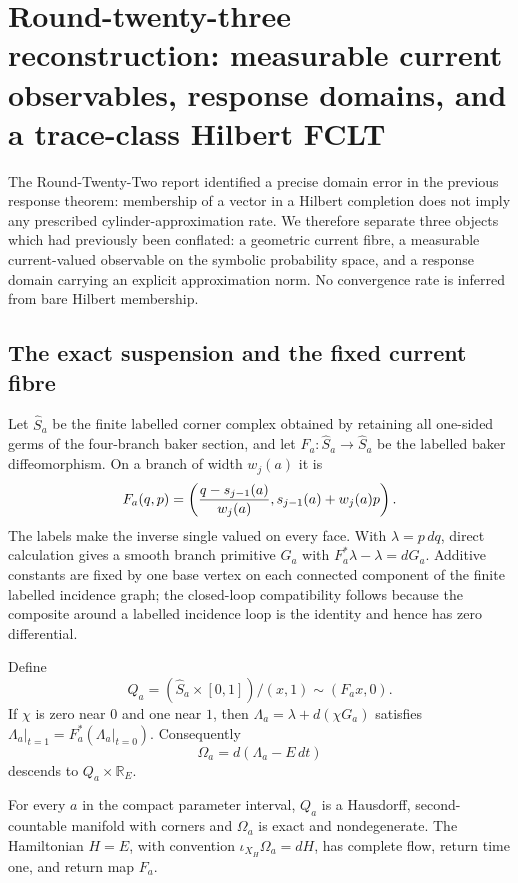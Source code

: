 \section{Round-twenty-three reconstruction: measurable current observables, response domains, and a trace-class Hilbert FCLT}
\label{sec:r23-a1}

The Round-Twenty-Two report identified a precise domain error in the previous
response theorem: membership of a vector in a Hilbert completion does not imply
any prescribed cylinder-approximation rate.  We therefore separate three
objects which had previously been conflated: a geometric current fibre, a
measurable current-valued observable on the symbolic probability space, and a
response domain carrying an explicit approximation norm.  No convergence rate
is inferred from bare Hilbert membership.

\subsection{The exact suspension and the fixed current fibre}

Let $\widehat S_a$ be the finite labelled corner complex obtained by retaining
all one-sided germs of the four-branch baker section, and let
$F_a:\widehat S_a\to\widehat S_a$ be the labelled baker diffeomorphism.  On a
branch of width $w_j(a)$ it is
\[
 F_a(q,p)=\left({q-s_{j-1}(a)\over w_j(a)},
 s_{j-1}(a)+w_j(a)p\right).
\]
The labels make the inverse single valued on every face.  With
$\lambda=p\,dq$, direct calculation gives a smooth branch primitive $G_a$ with
$F_a^*\lambda-\lambda=dG_a$.  Additive constants are fixed by one base vertex
on each connected component of the finite labelled incidence graph; the
closed-loop compatibility follows because the composite around a labelled
incidence loop is the identity and hence has zero differential.

Define
\[
 Q_a=(\widehat S_a\times[0,1])/(x,1)\sim(F_ax,0).
\]
If $\chi$ is zero near $0$ and one near $1$, then
$\Lambda_a=\lambda+d(\chi G_a)$ satisfies
$\Lambda_a|_{t=1}=F_a^*(\Lambda_a|_{t=0})$.  Consequently
\[
 \Omega_a=d(\Lambda_a-E\,dt)
\]
descends to $Q_a\times\mathbb R_E$.

\begin{proposition}
\label{prop:r23-a1-suspension}
For every $a$ in the compact parameter interval, $Q_a$ is a Hausdorff,
second-countable manifold with corners and $\Omega_a$ is exact and
nondegenerate.  The Hamiltonian $H=E$, with convention
$\iota_{X_H}\Omega_a=dH$, has complete flow, return time one, and return map
$F_a$.
\end{proposition}

